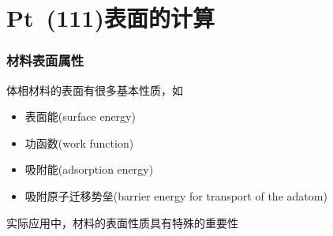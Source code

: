 \section{\rm{Pt~(111)}表面的计算}\label{Sec:Surface-Pt}
\frame
{
	\frametitle{材料表面属性}
体相材料的表面有很多基本性质，如
\begin{itemize}
	\item 表面能\textrm{(surface energy)}
	\item 功函数\textrm{(work function)}
	\item 吸附能\textrm{(adsorption energy)}
	\item 吸附原子迁移势垒\textrm{(barrier energy for transport of the adatom)}
\end{itemize}
实际应用中，材料的表面性质具有特殊的重要性%
{\fontsize{8.0pt}{5.2pt}\selectfont{
	\begin{itemize}
		\item 表面能是表面形貌学研究(向外/向内弛豫、重构、屈服分析)和裂纹扩散到断裂研究的重要因素
		\item 功函数、吸附能/解吸能和势垒能量是研究表面氧化、薄膜表面和纳米结构的生长和稳定、腐蚀、钝化和催化反应的决定因素%
	\end{itemize}
}}
}
\frame
